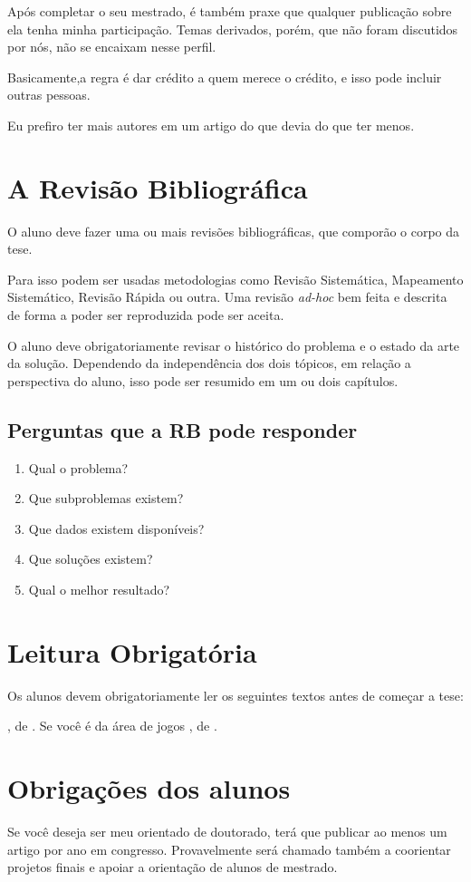 \documentclass[a4paper,12pt]{report}
\newcommand{\listalivro}[1]{\citetitle{#1}, de \citet{#1}.}
\begin{document}
Após completar o seu mestrado, é também praxe que qualquer publicação sobre ela tenha minha participação.
Temas derivados, porém, que não foram discutidos por nós, não se encaixam nesse perfil.

Basicamente,a regra é dar crédito a quem merece o crédito, e isso pode incluir outras pessoas.

Eu prefiro ter mais autores em um artigo do que devia do que ter menos.

\chapter{A Revisão Bibliográfica}

O aluno deve fazer uma ou mais revisões bibliográficas, que comporão o corpo da tese.

Para isso podem ser usadas metodologias como Revisão Sistemática, Mapeamento Sistemático, Revisão Rápida ou outra. Uma revisão \textit{ad-hoc} bem feita e descrita de forma a poder ser reproduzida pode ser aceita.

O aluno deve obrigatoriamente revisar o histórico do problema e o estado da arte da solução. Dependendo da independência dos dois tópicos, em relação a perspectiva do aluno, isso pode ser resumido em um ou dois capítulos.

\section{Perguntas que a RB pode responder}
\begin{enumerate}
    \item Qual o problema?
    \item Que subproblemas existem?
    \item Que dados existem disponíveis?
    \item Que soluções existem?
    \item Qual o melhor resultado?
\end{enumerate}

\chapter{Leitura Obrigatória}

Os alunos devem obrigatoriamente ler os seguintes textos antes de começar a tese:
\begin{outline}
\1 \listalivro{Dresch:2015}
\1 Se você é da área de jogos
\2 \listalivro{Xexeo:2017}
\end{outline}

\chapter{Obrigações dos alunos}

Se você deseja ser meu orientado de doutorado, terá que publicar ao menos um artigo por ano em congresso. Provavelmente será chamado também a coorientar projetos finais e apoiar a orientação de alunos de mestrado.




\printbibliography
\end{document}
